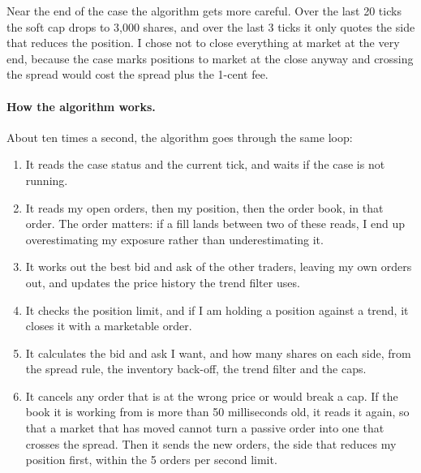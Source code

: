 \documentclass{article}
\begin{document}
\noindent Near the end of the case the algorithm gets more careful. Over the last 20 ticks the soft cap drops to 3{,}000 shares, and over the last 3 ticks it only quotes the side that reduces the position. I chose not to close everything at market at the very end, because the case marks positions to market at the close anyway and crossing the spread would cost the spread plus the 1-cent fee.

\paragraph{How the algorithm works.}
About ten times a second, the algorithm goes through the same loop:
\begin{enumerate}
  \item It reads the case status and the current tick, and waits if the case is not running.
  \item It reads my open orders, then my position, then the order book, in that order. The order matters: if a fill lands between two of these reads, I end up overestimating my exposure rather than underestimating it.
  \item It works out the best bid and ask of the other traders, leaving my own orders out, and updates the price history the trend filter uses.
  \item It checks the position limit, and if I am holding a position against a trend, it closes it with a marketable order.
  \item It calculates the bid and ask I want, and how many shares on each side, from the spread rule, the inventory back-off, the trend filter and the caps.
  \item It cancels any order that is at the wrong price or would break a cap. If the book it is working from is more than 50 milliseconds old, it reads it again, so that a market that has moved cannot turn a passive order into one that crosses the spread. Then it sends the new orders, the side that reduces my position first, within the 5 orders per second limit.
\end{enumerate}
\end{document}
